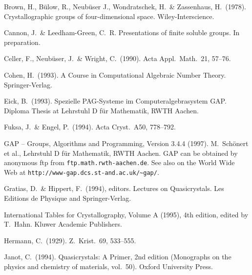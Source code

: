 \documentclass[12pt]{amsart}
\let\nwline=\newline
\renewcommand{\newline}{\nwline\mbox{}}
\begin{document}
\begin{thebibliography}{}

   Brown, H., B{\"u}low, R., Neub{\"u}ser J., Wondratschek, H.\ 
   \& Zassenhaus, H.\ (1978).
   \newline\qquad
   Crystallographic groups of four-dimensional space.
   Wiley-Interscience.

   Cannon, J.\ \& Leedham-Green, C.\ R.
   Presentations of finite soluble groups.
   In preparation.

   Celler, F., Neub{\"u}ser, J.\ \& Wright, C.\ (1990).
   Acta Appl.\ Math.\ 21, 57--76.

   Cohen, H.\ (1993).
   A Course in Computational Algebraic Number Theory.
   Springer-Verlag.

   Eick, B.\ (1993).
   Spezielle PAG-Systeme im Computeralgebrasystem GAP.
   \newline\qquad
   Diploma Thesis at Lehrstuhl D f\"ur Mathematik, RWTH Aachen.

   Fuksa, J.\ \& Engel, P.\ (1994).
   Acta Cryst.\ A50, 778--792.

   {\sf GAP} -- Groups, Algorithms and Programming, Version 3.4.4 (1997). 
   \newline\qquad
   M.~Sch\"onert et al., Lehrstuhl D f\"ur Mathematik, RWTH Aachen.
   \newline\qquad
   {\sf GAP} can be obtained by anonymous ftp from 
   {\tt ftp.math.rwth-aachen.de}.
   \newline\qquad
   See also on the World Wide Web at 
   {\tt http://www-gap.dcs.st-and.ac.uk/\~{}gap/}.

   Gratias, D.\ \& Hippert, F.\ (1994), editors.
   Lectures on Quasicrystals.
   \newline\qquad
   Les Editions de Physique and Springer-Verlag.

   International Tables for Crystallography, Volume A (1995),
   4th edition, edited by T.\ Hahn. 
   \newline\qquad
   Kluwer Academic Publishers.

   Hermann, C.\ (1929).
   Z.\ Krist.\ 69, 533--555.

   Janot, C.\ (1994).
   Quasicrystals: A Primer, 2nd edition
   (Monographs on the physics and
   \newline\qquad
   chemistry of materials, vol.~50). Oxford University Press.


\end{thebibliography}
\end{document}
